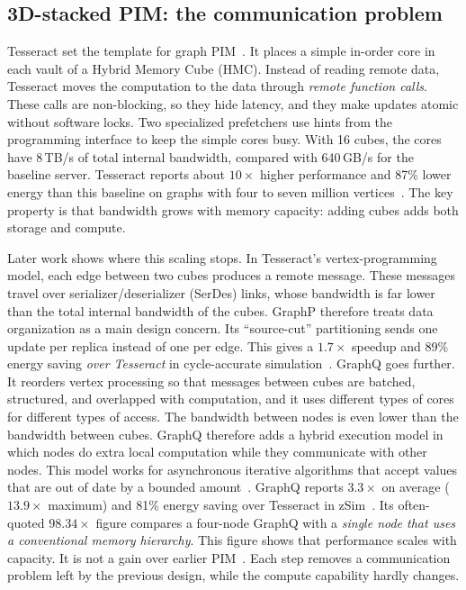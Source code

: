 \documentclass[journal,onecolumn]{IEEEtran}
\begin{document}
\subsection{3D-stacked PIM: the communication problem}
Tesseract set the template for graph PIM~\cite{ahn2015tesseract}. It places a simple in-order core in each vault of a Hybrid Memory Cube (HMC). Instead of reading remote data, Tesseract moves the computation to the data through \emph{remote function calls}. These calls are non-blocking, so they hide latency, and they make updates atomic without software locks. Two specialized prefetchers use hints from the programming interface to keep the simple cores busy. With 16 cubes, the cores have 8\,TB/s of total internal bandwidth, compared with 640\,GB/s for the baseline server. Tesseract reports about $10\times$ higher performance and 87\% lower energy than this baseline on graphs with four to seven million vertices~\cite{ahn2015tesseract}. The key property is that bandwidth grows with memory capacity: adding cubes adds both storage and compute.

Later work shows where this scaling stops. In Tesseract's vertex-programming model, each edge between two cubes produces a remote message. These messages travel over serializer/deserializer (SerDes) links, whose bandwidth is far lower than the total internal bandwidth of the cubes. GraphP therefore treats data organization as a main design concern. Its ``source-cut'' partitioning sends one update per replica instead of one per edge. This gives a $1.7\times$ speedup and 89\% energy saving \emph{over Tesseract} in cycle-accurate simulation~\cite{zhang2018graphp}. GraphQ goes further. It reorders vertex processing so that messages between cubes are batched, structured, and overlapped with computation, and it uses different types of cores for different types of access. The bandwidth between nodes is even lower than the bandwidth between cubes. GraphQ therefore adds a hybrid execution model in which nodes do extra local computation while they communicate with other nodes. This model works for asynchronous iterative algorithms that accept values that are out of date by a bounded amount~\cite{zhuo2019graphq}. GraphQ reports $3.3\times$ on average ($13.9\times$ maximum) and 81\% energy saving over Tesseract in zSim~\cite{zhuo2019graphq}. Its often-quoted $98.34\times$ figure compares a four-node GraphQ with a \emph{single node that uses a conventional memory hierarchy}. This figure shows that performance scales with capacity. It is not a gain over earlier PIM~\cite{zhuo2019graphq}. Each step removes a communication problem left by the previous design, while the compute capability hardly changes.
\end{document}
